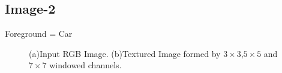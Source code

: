 \documentclass{article}
\begin{document}
\newpage
\subsection{Image-2}
Foreground = Car\\
\begin{figure}[!htbp]
     \centering
     \captionsetup[subfigure]{labelformat=empty}
    \caption{(a)Input RGB Image. (b)Textured Image formed by $3\times 3$,$5\times 5$ and $7\times 7$ windowed channels.}
    \label{fig:car_1}
\end{figure}
\end{document}
